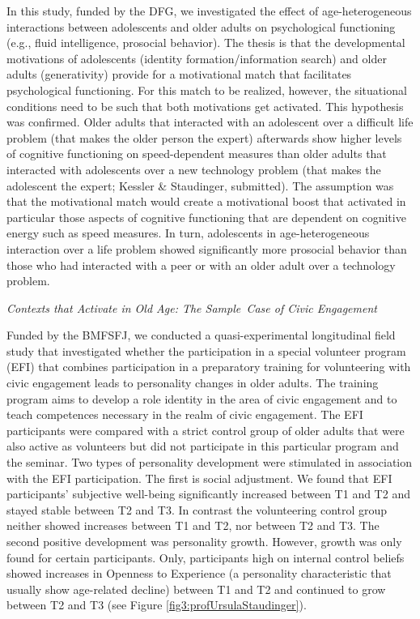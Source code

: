  In this study, funded by the DFG, we investigated the effect of age-heterogeneous interactions between adolescents and older adults on psychological functioning (e.g., fluid intelligence, prosocial behavior). The thesis is that the developmental motivations of adolescents (identity formation/information search) and older adults (generativity) provide for a motivational match that facilitates psychological functioning. For this match to be realized, however, the situational conditions need to be such that both motivations get activated. This hypothesis was confirmed. Older adults that interacted with an adolescent over a difficult life problem (that makes the older person the expert) afterwards show higher levels of cognitive functioning on speed-dependent measures than older adults that interacted with adolescents over a new technology problem (that makes the adolescent the expert; Kessler \& Staudinger, submitted). The assumption was that the motivational match would create a motivational boost that activated in particular those aspects of cognitive functioning that are dependent on cognitive energy such as speed measures. In turn, adolescents in age-heterogeneous interaction over a life problem showed significantly more prosocial behavior than those who had interacted with a peer or with an older adult over a technology problem. 

\textit{Contexts that Activate in Old Age: The Sample~Case of Civic Engagement}

 Funded by the BMFSFJ, we conducted a quasi-experimental longitudinal field study that investigated whether the participation in a special volunteer program (EFI) that combines participation in a preparatory training for volunteering with civic engagement leads to personality changes in older adults. The training program aims to develop a role identity in the area of civic engagement and to teach competences necessary in the realm of civic engagement. The EFI participants were compared with a strict control group of older adults that were also active as volunteers but did not participate in this particular program and the seminar. Two types of personality development were stimulated in association with the EFI participation. The first is social adjustment. We found that EFI participants' subjective well-being significantly increased between T1 and T2 and stayed stable between T2 and T3. In contrast the volunteering control group neither showed increases between T1 and T2, nor between T2 and T3. The second positive development was personality growth. However, growth was only found for certain participants. Only, participants high on internal control beliefs showed increases in Openness to Experience (a personality characteristic that usually show age-related decline) between T1 and T2 and continued to grow between T2 and T3 (see Figure \ref{fig3:profUrsulaStaudinger}).

